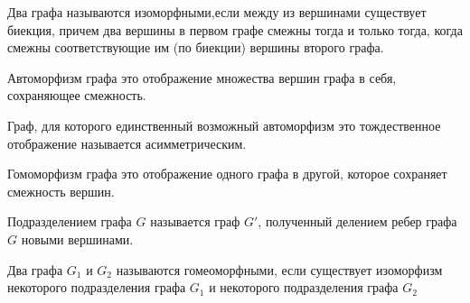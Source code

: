 
\begin{definition}
  Два графа называются изоморфными,если между из вершинами существует биекция,
  причем два вершины в первом графе смежны тогда и только тогда, когда смежны
  соответствующие им (по биекции) вершины второго графа.
\end{definition}

\begin{definition}
  Автоморфизм графа это отображение множества вершин графа в себя, сохраняющее
  смежность.
\end{definition}

\begin{remark}
  Граф, для которого единственный возможный автоморфизм это тождественное
  отображение называется асимметрическим.
\end{remark}

\begin{definition}
  Гомоморфизм графа это отображение одного графа в другой, которое сохраняет
  смежность вершин.
\end{definition}

\begin{definition}
  Подразделением графа \(G\) называется граф \(G'\), полученный делением ребер
  графа \(G\) новыми вершинами.
\end{definition}

\begin{definition}
  Два графа \(G_{1}\) и \(G_{2}\) называются гомеоморфными, если существует
  изоморфизм некоторого подразделения графа \(G_{1}\) и некоторого подразделения
  графа \(G_{2}\)
\end{definition}
